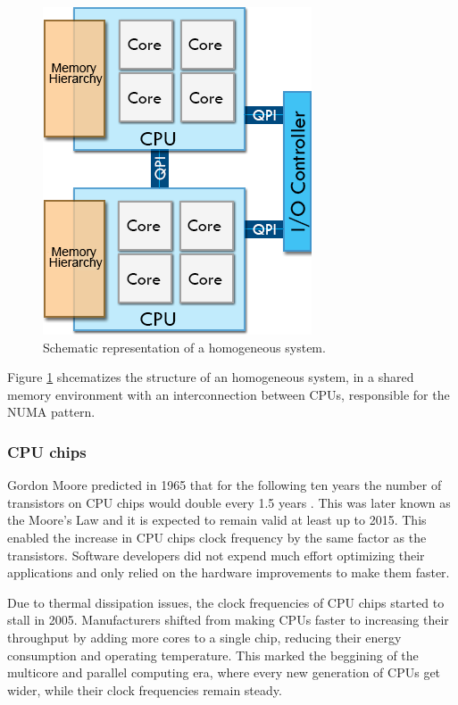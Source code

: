 \begin{figure}[!htp]
	\begin{center}
		\includegraphics[scale=0.5]{../../common/img/numa_qpi.png}
		\caption{Schematic representation of a homogeneous system.}
		\label{fig:HomogeneousSystem}
	\end{center}
\end{figure}

Figure \ref{fig:HomogeneousSystem} shcematizes the structure of an homogeneous system, in a shared memory environment with an interconnection between CPUs, responsible for the NUMA pattern.

\subsubsection*{CPU chips}
\label{CPUChips}

Gordon Moore predicted in 1965 that for the following ten years the number of transistors on CPU chips would double every 1.5 years \cite{MooreLaw}. This was later known as the Moore's Law and it is expected to remain valid at least up to 2015. This enabled the increase in CPU chips clock frequency by the same factor as the transistors. Software developers did not expend much effort optimizing their applications and only relied on the hardware improvements to make them faster.

Due to thermal dissipation issues, the clock frequencies of CPU chips started to stall in 2005. Manufacturers shifted from making CPUs faster to increasing their throughput by adding more cores to a single chip, reducing their energy consumption and operating temperature. This marked the beggining of the multicore and parallel computing era, where every new generation of CPUs get wider, while their clock frequencies remain steady.

